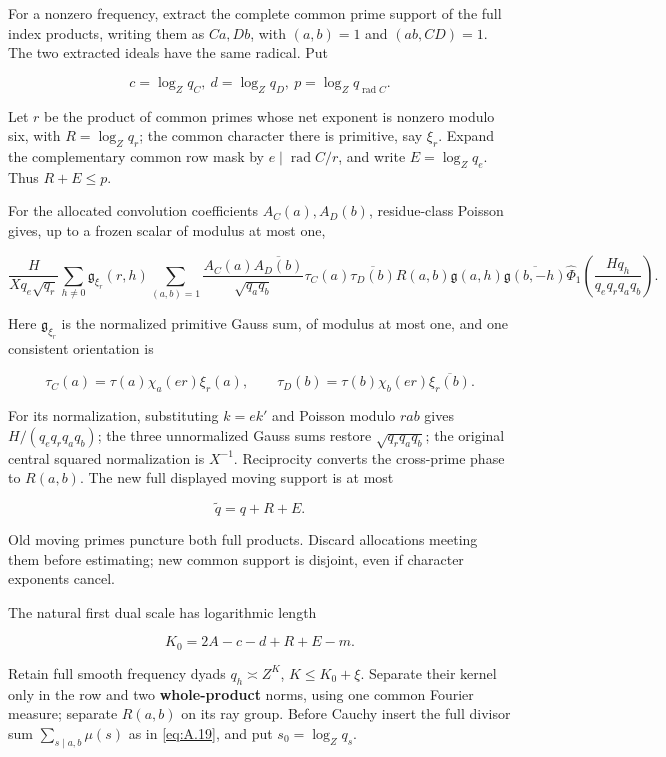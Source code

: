 \documentclass[11pt,a4paper]{article}
\begin{document}
For a nonzero frequency, extract the complete common prime support of the full index products, writing them as \(Ca,Db\), with \((a,b)=1\) and \((ab,CD)=1\). The two extracted ideals have the same radical. Put

\[
c=\log_Zq_C,\ d=\log_Zq_D,\ p=\log_Zq_{\operatorname{rad}C}.
\]

Let \(r\) be the product of common primes whose net exponent is nonzero modulo six, with \(R=\log_Zq_r\); the common character there is primitive, say \(\xi_r\). Expand the complementary common row mask by \(e\mid\operatorname{rad}C/r\), and write \(E=\log_Zq_e\). Thus \(R+E\le p\).

For the allocated convolution coefficients \(A_C(a),A_D(b)\), residue-class Poisson gives, up to a frozen scalar of modulus at most one,

\[
\frac{H}{Xq_e\sqrt{q_r}}
\sum_{h\ne0}\mathfrak g_{\xi_r}(r,h)
\sum_{(a,b)=1}\frac{A_C(a)\overline{A_D(b)}}{\sqrt{q_aq_b}}
\tau_C(a)\overline{\tau_D(b)}R(a,b)
\mathfrak g(a,h)\overline{\mathfrak g(b,-h)}
\widehat\Phi_1\!\left(\frac{Hq_h}{q_eq_rq_aq_b}\right).
\tag{D.10}\label{eq:D.10}
\]

Here \(\mathfrak g_{\xi_r}\) is the normalized primitive Gauss sum, of modulus at most one, and one consistent orientation is

\[
\tau_C(a)=\tau(a)\chi_a(er)\xi_r(a),\qquad
\tau_D(b)=\tau(b)\chi_b(er)\overline{\xi_r(b)}.
\]

For its normalization, substituting \(k=ek'\) and Poisson modulo \(rab\) gives \(H/(q_eq_rq_aq_b)\); the three unnormalized Gauss sums restore \(\sqrt{q_rq_aq_b}\); the original central squared normalization is \(X^{-1}\). Reciprocity converts the cross-prime phase to \(R(a,b)\). The new full displayed moving support is at most

\[
\widetilde q=q+R+E.
\tag{D.11}\label{eq:D.11}
\]

Old moving primes puncture both full products. Discard allocations meeting them before estimating; new common support is disjoint, even if character exponents cancel.

The natural first dual scale has logarithmic length

\[
K_0=2A-c-d+R+E-m.
\tag{D.12}\label{eq:D.12}
\]

Retain full smooth frequency dyads \(q_h\asymp Z^K\), \(K\le K_0+\xi\). Separate their kernel only in the row and two \textbf{whole-product} norms, using one common Fourier measure; separate \(R(a,b)\) on its ray group. Before Cauchy insert the full divisor sum \(\sum_{s\mid a,b}\mu(s)\) as in \eqref{eq:A.19}, and put \(s_0=\log_Zq_s\).
\end{document}

